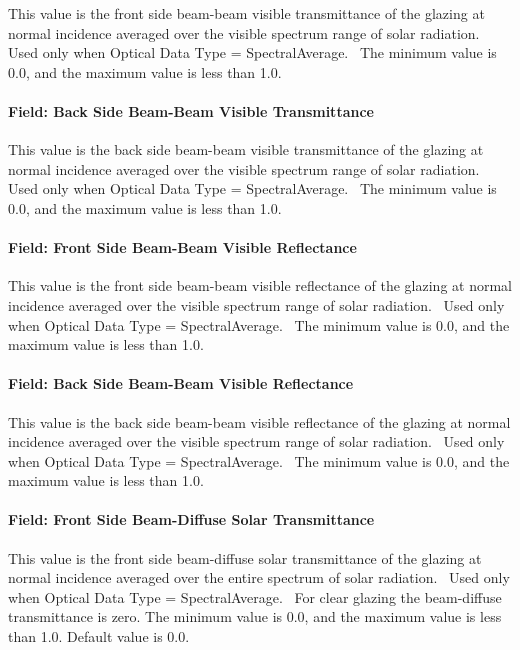 This value is the front side beam-beam visible transmittance of the glazing at normal incidence averaged over the visible spectrum range of solar radiation.~ Used only when Optical Data Type = SpectralAverage.~ The minimum value is 0.0, and the maximum value is less than 1.0.

\paragraph{Field: Back Side Beam-Beam Visible Transmittance}\label{field-back-side-beam-beam-visible-transmittance}

This value is the back side beam-beam visible transmittance of the glazing at normal incidence averaged over the visible spectrum range of solar radiation.~ Used only when Optical Data Type = SpectralAverage.~ The minimum value is 0.0, and the maximum value is less than 1.0.

\paragraph{Field: Front Side Beam-Beam Visible Reflectance}\label{field-front-side-beam-beam-visible-reflectance}

This value is the front side beam-beam visible reflectance of the glazing at normal incidence averaged over the visible spectrum range of solar radiation.~ Used only when Optical Data Type = SpectralAverage.~ The minimum value is 0.0, and the maximum value is less than 1.0.

\paragraph{Field: Back Side Beam-Beam Visible Reflectance}\label{field-back-side-beam-beam-visible-reflectance}

This value is the back side beam-beam visible reflectance of the glazing at normal incidence averaged over the visible spectrum range of solar radiation.~ Used only when Optical Data Type = SpectralAverage.~ The minimum value is 0.0, and the maximum value is less than 1.0.

\paragraph{Field: Front Side Beam-Diffuse Solar Transmittance}\label{field-front-side-beam-diffuse-solar-transmittance}

This value is the front side beam-diffuse solar transmittance of the glazing at normal incidence averaged over the entire spectrum of solar radiation.~ Used only when Optical Data Type = SpectralAverage.~ For clear glazing the beam-diffuse transmittance is zero. The minimum value is 0.0, and the maximum value is less than 1.0. Default value is 0.0.

